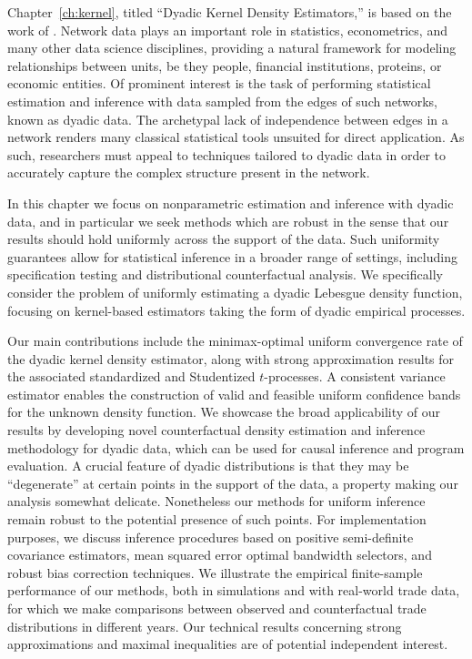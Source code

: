 Chapter~\ref{ch:kernel}, titled ``Dyadic Kernel Density Estimators,'' is based
on the work of \cite{cattaneo2024uniform}. Network data plays an important role
in statistics, econometrics, and many other data science disciplines, providing
a natural framework for modeling relationships between units, be they people,
financial institutions, proteins, or economic entities. Of prominent interest
is the task of performing statistical estimation and inference with data
sampled from the edges of such networks, known as dyadic data. The archetypal
lack of independence between edges in a network renders many classical
statistical tools unsuited for direct application. As such, researchers must
appeal to techniques tailored to dyadic data in order to accurately capture the
complex structure present in the network.

In this chapter we focus on nonparametric estimation and inference with dyadic
data, and in particular we seek methods which are robust in the sense that our
results should hold uniformly across the support of the data. Such uniformity
guarantees allow for statistical inference in a broader range of settings,
including specification testing and distributional counterfactual analysis. We
specifically consider the problem of uniformly estimating a dyadic Lebesgue
density function, focusing on kernel-based estimators taking the form of dyadic
empirical processes.

Our main contributions include the minimax-optimal uniform convergence rate of
the dyadic kernel density estimator, along with strong approximation results
for the associated standardized and Studentized $t$-processes. A consistent
variance estimator enables the construction of valid and feasible uniform
confidence bands for the unknown density function. We showcase the broad
applicability of our results by developing novel counterfactual density
estimation and inference methodology for dyadic data, which can be used for
causal inference and program evaluation.
A crucial feature of dyadic distributions is that they may be ``degenerate'' at
certain points in the support of the data, a property making our analysis
somewhat delicate. Nonetheless our methods for uniform inference remain robust
to the potential presence of such points.
For implementation purposes, we discuss inference procedures based on positive
semi-definite covariance estimators, mean squared error optimal bandwidth
selectors, and robust bias correction techniques. We illustrate the empirical
finite-sample performance of our methods, both in simulations and with
real-world trade data, for which we make comparisons between observed and
counterfactual trade distributions in different years. Our technical results
concerning strong approximations and maximal inequalities are of potential
independent interest.

